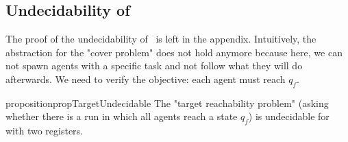 \subsection{Undecidability of \Target}
\label{sec:undec-target}

The proof of the undecidability of \Target~is left in the appendix. Intuitively, the abstraction for the "cover problem" does not hold anymore because here, we can not spawn agents with a specific task and not follow what they will do afterwards. We need to verify the objective: each agent must reach $q_f$.  


\begin{restatable}{proposition}{propTargetUndecidable}
\label{prop:target-undec}
	The "target reachability problem" (asking whether there is a run in which all agents reach a state $q_f$) is undecidable for \BNRA with two registers.
\end{restatable}
